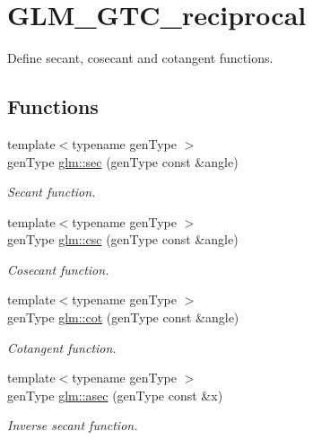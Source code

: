 \hypertarget{group__gtc__reciprocal}{\section{G\-L\-M\-\_\-\-G\-T\-C\-\_\-reciprocal}
\label{group__gtc__reciprocal}
}


Define secant, cosecant and cotangent functions.  


\subsection*{Functions}
\begin{DoxyCompactItemize}
\item 
{\footnotesize template$<$typename gen\-Type $>$ }\\gen\-Type \hyperlink{group__gtc__reciprocal_gab95b8f3c8aff3fbf2a50881a5977dd0d}{glm\-::sec} (gen\-Type const \&angle)
\begin{DoxyCompactList}\small\item\em Secant function. \end{DoxyCompactList}\item 
{\footnotesize template$<$typename gen\-Type $>$ }\\gen\-Type \hyperlink{group__gtc__reciprocal_ga3fc2ddd96679f1c3457561f1febd6051}{glm\-::csc} (gen\-Type const \&angle)
\begin{DoxyCompactList}\small\item\em Cosecant function. \end{DoxyCompactList}\item 
{\footnotesize template$<$typename gen\-Type $>$ }\\gen\-Type \hyperlink{group__gtc__reciprocal_gac336f426a9db332c8d8d697d2b401a3c}{glm\-::cot} (gen\-Type const \&angle)
\begin{DoxyCompactList}\small\item\em Cotangent function. \end{DoxyCompactList}\item 
{\footnotesize template$<$typename gen\-Type $>$ }\\gen\-Type \hyperlink{group__gtc__reciprocal_ga8bc6073587eccc1e5951250f25d78ef6}{glm\-::asec} (gen\-Type const \&x)
\begin{DoxyCompactList}\small\item\em Inverse secant function. \end{DoxyCompactList}\item 

\end{DoxyCompactItemize}
